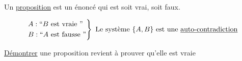 \begin{defn}
	Un \underline{proposition} est un énoncé qui est soit vrai, soit faux.
\end{defn}

\begin{exm}
	\begin{align*}
		\begin{rcases*}
			A: ``B \text{ est vraie }"\\
			B: ``A \text{ est fausse }"\\
		\end{rcases*} \text{ Le système $\{A,B\}$ est une \underline{auto-contradiction}}
	\end{align*}
\end{exm}

\begin{defn}
	\underline{Démontrer} une proposition revient à prouver qu'elle est vraie
\end{defn}
